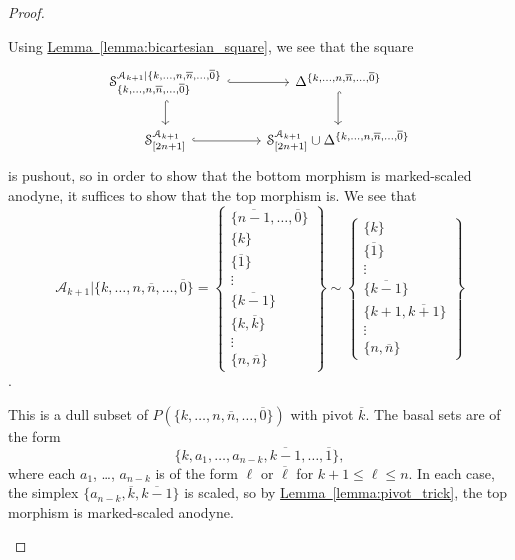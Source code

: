 \documentclass[main.tex]{subfiles}
\begin{document}
\begin{proof}
\begin{enumerate}
\begin{itemize}
          Using \hyperref[lemma:bicartesian_square]{Lemma~\ref*{lemma:bicartesian_square}}, we see that the square
          \begin{equation*}
            \begin{tikzcd}
              \S^{\mathcal{A}_{k+1}|\{k, \ldots, n, \overline{n}, \ldots, \overline{0}\}}_{\{k, \ldots, n, \overline{n}, \ldots, \overline{0}\}}
              \arrow[r, hook]
              \arrow[d, hook]
              & \Delta^{\{k, \ldots, n, \overline{n}, \ldots, \overline{0}\}}
              \arrow[d, hook]
              \\
              \S^{\mathcal{A}_{k+1}}_{[2n+1]}
              \arrow[r, hook]
              & \S^{\mathcal{A}_{k+1}}_{[2n+1]} \cup \Delta^{\{k, \ldots, n, \overline{n}, \ldots, \overline{0}\}}
            \end{tikzcd}
          \end{equation*}
          is pushout, so in order to show that the bottom morphism is marked-scaled anodyne, it suffices to show that the top morphism is. We see that
          \begin{equation*}
            \mathcal{A}_{k+1}|\{k, \ldots, n, \overline{n}, \ldots, \overline{0}\} =
            \left\{ \substack{ \{\overline{n-1}, \ldots, \overline{0}\} \\ \{k\} \\ \{\overline{1}\} \\ \vdots \\ \{\overline{k-1}\} \\ \{k, \overline{k}\} \\ \vdots \\ \{n, \overline{n}\} } \right\}
            \sim \left\{ \substack{ \{k\} \\ \{\overline{1}\} \\ \vdots \\ \{\overline{k-1}\} \\ \{k+1, \overline{k+1}\} \\ \vdots \\ \{n, \overline{n}\} } \right\}
          \end{equation*}.

          This is a dull subset of $P(\{k, \ldots, n, \overline{n}, \ldots, \overline{0}\})$ with pivot $\overline{k}$. The basal sets are of the form
          \begin{equation*}
            \{k, a_{1}, \ldots, a_{n-k}, \overline{k-1}, \ldots, \overline{1}\},
          \end{equation*}
          where each $a_{1}$, \dots, $a_{n-k}$ is of the form $\ell$ or $\overline{\ell}$ for $k+1 \leq \ell \leq n$. In each case, the simplex $\{a_{n-k}, \overline{k}, \overline{k-1}\}$ is scaled, so by \hyperref[lemma:pivot_trick]{Lemma~\ref*{lemma:pivot_trick}}, the top morphism is marked-scaled anodyne.
      \end{itemize}


\end{enumerate}
\end{proof}
\end{document}
